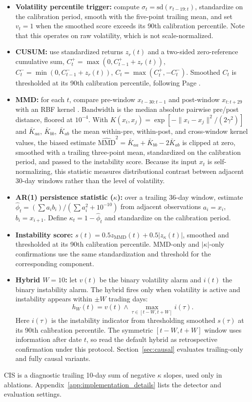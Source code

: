 \documentclass[pdflatex,sn-mathphys-num,iicol]{sn-jnl}
\begin{document}
\begin{itemize}
\item \textbf{Volatility percentile trigger:} compute $\sigma_t=\mathrm{sd}(r_{t-19:t})$, standardize on the calibration period, smooth with the five-point trailing mean, and set $v_t=1$ when the smoothed score exceeds its 90th calibration percentile. Note that this operates on raw volatility, which is not scale-normalized.
\item \textbf{CUSUM:} use standardized returns $z_r(t)$ and a two-sided zero-reference cumulative sum, $C_t^+=\max(0,C_{t-1}^+ + z_r(t))$, $C_t^-=\min(0,C_{t-1}^- + z_r(t))$, $C_t=\max(C_t^+,-C_t^-)$. Smoothed $C_t$ is thresholded at its 90th calibration percentile, following Page \cite{page1954}.
\item \textbf{MMD:} for each $t$, compare pre-window $x_{t-30:t-1}$ and post-window $x_{t:t+29}$ with an RBF kernel \cite{gretton2012}. Bandwidth is the median absolute pairwise pre/post distance, floored at $10^{-4}$. With $K(x_i,x_j)=\exp[-\|x_i-x_j\|^2/(2\gamma^2)]$ and $\bar K_{aa}$, $\bar K_{bb}$, $\bar K_{ab}$ the mean within-pre, within-post, and cross-window kernel values, the biased estimate $\widehat{\mathrm{MMD}}^2=\bar K_{aa}+\bar K_{bb}-2\bar K_{ab}$ is clipped at zero, smoothed with a trailing three-point mean, standardized on the calibration period, and passed to the instability score. Because its input $x_t$ is self-normalizing, this statistic measures distributional contrast between adjacent 30-day windows rather than the level of volatility.
\item \textbf{AR(1) persistence statistic ($\kappa$):} over a trailing 36-day window, estimate $\widehat\phi_t=(\sum a_i b_i)/(\sum a_i^2+10^{-10})$ from adjacent observations $a_i=x_i$, $b_i=x_{i+1}$. Define $\kappa_t=1-\widehat\phi_t$ and standardize on the calibration period.
\item \textbf{Instability score:} $s(t)=0.5z_{\mathrm{MMD}}(t)+0.5|z_\kappa(t)|$, smoothed and thresholded at its 90th calibration percentile. MMD-only and $|\kappa|$-only confirmations use the same standardization and threshold for the corresponding component.
\item \textbf{Hybrid $W=10$:} let $v(t)$ be the binary volatility alarm and $i(t)$ the binary instability alarm. The hybrid fires only when volatility is active and instability appears within $\pm W$ trading days:
\begin{equation}
h_W(t)=v(t)\wedge \max_{\tau\in[t-W,t+W]}i(\tau).
\end{equation}
Here $i(\tau)$ is the instability indicator from thresholding smoothed $s(\tau)$ at its 90th calibration percentile. The symmetric $[t-W,t+W]$ window uses information after date $t$, so read the default hybrid as retrospective confirmation under this protocol. Section~\ref{sec:causal} evaluates trailing-only and fully causal variants.
\end{itemize}
CIS is a diagnostic trailing 10-day sum of negative $\kappa$ slopes, used only in ablations. Appendix~\ref{app:implementation_details} lists the detector and evaluation settings.
\end{document}
